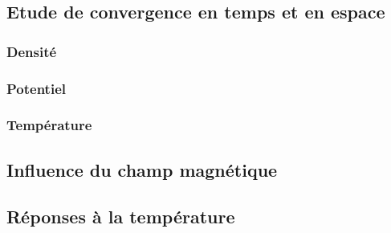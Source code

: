 \begin{refsection}
\subsection{Etude de convergence en temps et en espace}
\subsubsection{Densité}
\subsubsection{Potentiel}
\subsubsection{Température}
\subsection{Influence du champ magnétique}
\subsection{Réponses à la température}

%
%
\end{refsection}

